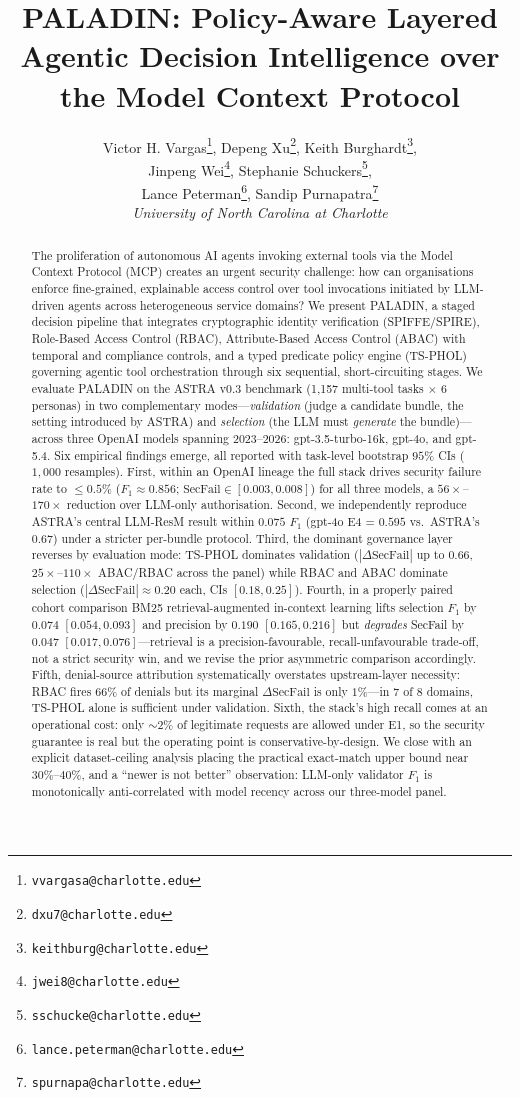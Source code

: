 \documentclass[10pt,a4paper,twocolumn]{article}
\title{PALADIN: Policy-Aware Layered Agentic Decision Intelligence over the Model Context Protocol}
\author{
  Victor H. Vargas\thanks{\texttt{vvargasa@charlotte.edu}},
  Depeng Xu\thanks{\texttt{dxu7@charlotte.edu}},
  Keith Burghardt\thanks{\texttt{keithburg@charlotte.edu}},\\
  Jinpeng Wei\thanks{\texttt{jwei8@charlotte.edu}},
  Stephanie Schuckers\thanks{\texttt{sschucke@charlotte.edu}},\\
  Lance Peterman\thanks{\texttt{lance.peterman@charlotte.edu}},
  Sandip Purnapatra\thanks{\texttt{spurnapa@charlotte.edu}}\\
  \textit{University of North Carolina at Charlotte}
}
\date{}
\begin{document}
\maketitle

\begin{abstract}
The proliferation of autonomous AI agents invoking external tools via the Model Context Protocol (MCP) creates an urgent security challenge: how can organisations enforce fine-grained, explainable access control over tool invocations initiated by LLM-driven agents across heterogeneous service domains? We present PALADIN, a staged decision pipeline that integrates cryptographic identity verification (SPIFFE/SPIRE), Role-Based Access Control (RBAC), Attribute-Based Access Control (ABAC) with temporal and compliance controls, and a typed predicate policy engine (TS-PHOL) governing agentic tool orchestration through six sequential, short-circuiting stages. We evaluate PALADIN on the ASTRA v0.3 benchmark (1{,}157 multi-tool tasks $\times$ 6 personas) in two complementary modes---\emph{validation} (judge a candidate bundle, the setting introduced by ASTRA) and \emph{selection} (the LLM must \emph{generate} the bundle)---across three OpenAI models spanning 2023--2026: gpt-3.5-turbo-16k, gpt-4o, and gpt-5.4. Six empirical findings emerge, all reported with task-level bootstrap $95\%$ CIs ($1{,}000$ resamples). First, within an OpenAI lineage the full stack drives security failure rate to $\leq 0.5\%$ ($F_1 \approx 0.856$; $\mathrm{SecFail}\in[0.003,0.008]$) for all three models, a $56\times$--$170\times$ reduction over LLM-only authorisation. Second, we independently reproduce ASTRA's central LLM-ResM result within $0.075$ $F_1$ (gpt-4o E4 = $0.595$ vs.\ ASTRA's $0.67$) under a stricter per-bundle protocol. Third, the dominant governance layer reverses by evaluation mode: TS-PHOL dominates validation ($|\Delta\text{SecFail}|$ up to $0.66$, $25\times$--$110\times$ ABAC/RBAC across the panel) while RBAC and ABAC dominate selection ($|\Delta\text{SecFail}|\approx 0.20$ each, CIs $[0.18,0.25]$). Fourth, in a properly paired cohort comparison BM25 retrieval-augmented in-context learning lifts selection $F_1$ by $0.074$ $[0.054,0.093]$ and precision by $0.190$ $[0.165,0.216]$ but \emph{degrades} SecFail by $0.047$ $[0.017,0.076]$---retrieval is a precision-favourable, recall-unfavourable trade-off, not a strict security win, and we revise the prior asymmetric comparison accordingly. Fifth, denial-source attribution systematically overstates upstream-layer necessity: RBAC fires $66\%$ of denials but its marginal $\Delta\text{SecFail}$ is only $1\%$---in $7$ of $8$ domains, TS-PHOL alone is sufficient under validation. Sixth, the stack's high recall comes at an operational cost: only $\sim 2\%$ of legitimate requests are allowed under E1, so the security guarantee is real but the operating point is conservative-by-design. We close with an explicit dataset-ceiling analysis placing the practical exact-match upper bound near $30\%$--$40\%$, and a ``newer is not better'' observation: LLM-only validator $F_1$ is monotonically anti-correlated with model recency across our three-model panel.

\end{abstract}
\end{document}

